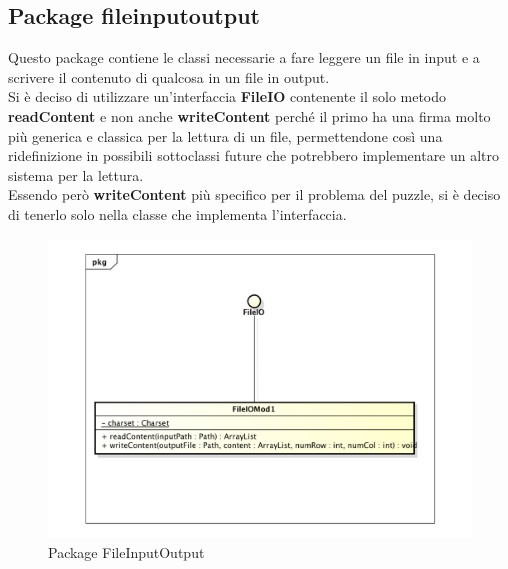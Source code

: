 	\subsection{Package fileinputoutput}
Questo package contiene le classi necessarie a fare leggere un file in input e a scrivere il contenuto di qualcosa in un file in output. \\
Si è deciso di utilizzare un'interfaccia \textbf{FileIO} contenente il solo metodo \textbf{readContent} e non anche \textbf{writeContent} perché il primo ha una firma molto più generica e classica per la lettura di un file, permettendone così una ridefinizione in possibili sottoclassi future che potrebbero implementare un altro sistema per la lettura. \\
Essendo però \textbf{writeContent} più specifico per il problema del puzzle, si è deciso di tenerlo solo nella classe che implementa l'interfaccia.

		\begin{figure}[htbp]
			\centering
			\includegraphics[width=15cm]{img/FileInputOutput.pdf}
			\caption{Package FileInputOutput}
			\label{Package FileInputOutput}
		\end{figure}

	
